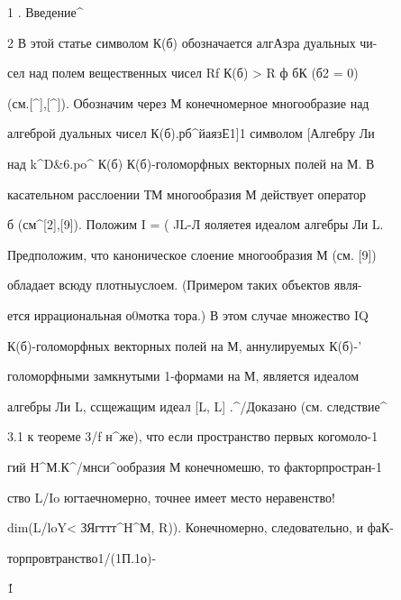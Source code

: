 \vskip 0.5cm 


 








 


\label{end} 


 


 


 


 


 


 


1 . Введение^ 


 


2 В этой статье символом К(б) обозначается алгАзра дуальных чи- 


сел над полем вещественных чисел Rf К(б) > R ф бК (б2 = 0) 


(см.[^],[^]). Обозначим через М конечномерное многообразие над 


алгеброй дуальных чисел К(б).рб^йаязЕ1]1 символом [Алгебру Ли 


над k^D&6.po^ К(б) К(б)-голоморфных векторных полей на М. В 


касательном расслоении ТМ многообразия М действует оператор 


 


 


 


б (см^[2],[9]). Положим I = ( JL-Л яоляетея идеалом алгебры Ли L. 


Предположим, что каноническое слоение многообразия М (см. [9]) 


обладает всюду плотныуслоем. (Примером таких объектов явля- 


ется иррациональная о0мотка тора.) В этом случае множество IQ 


К(б)-голоморфных векторных полей на М, аннулируемых К(б)-' 


голоморфными замкнутыми 1-формами на М, является идеалом 


алгебры Ли L, ссщежащим идеал [L, L] .^/Доказано (см. следствие^ 


3.1 к теореме 3/f н^же), что если пространство первых когомоло-1 


гий Н^М.К^/мнси^ообразия М конечномешю, то факторпростран-1 


ство L/Io югтаечномерно, точнее имеет место неравенство! 


dim(L/loY< ЗЯгттт^Н^М, R)). Конечномерно, следовательно, и фаК- 


торпровтранство1/(1П.1о)- 


 


\'1 


